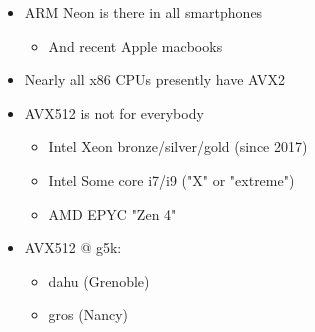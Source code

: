 \documentclass[xcolor={x11names,svgnames}]{beamer}
\begin{document}

\begin{frame}
  \begin{itemize}
  \item ARM Neon is there in all smartphones 
    \begin{itemize}
    \item And recent Apple macbooks
    \end{itemize}
    \medskip
    
    \item Nearly all x86 CPUs presently have AVX2 

      \medskip

    \item AVX512 is not for everybody
      \begin{itemize}
      \item Intel Xeon bronze/silver/gold (since 2017)
      \item Intel Some core i7/i9 ("X" or "extreme") 
      \item AMD EPYC "Zen 4"
      \end{itemize}
    

    \medskip

  \item AVX512 @ g5k:
    \begin{itemize}
    \item dahu (Grenoble)
      \item gros (Nancy) 
    \end{itemize}
    
  \end{itemize}
\end{frame}

\end{document}
